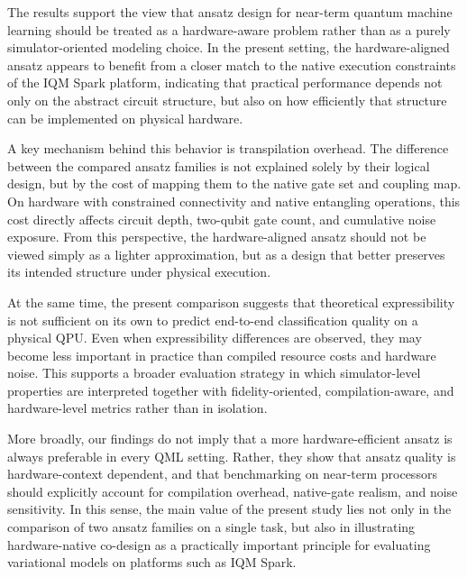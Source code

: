 \documentclass[11pt]{article}
\begin{document}
The results support the view that ansatz design for near-term quantum machine learning should be treated as a hardware-aware problem rather than as a purely simulator-oriented modeling choice. In the present setting, the hardware-aligned ansatz appears to benefit from a closer match to the native execution constraints of the IQM Spark platform, indicating that practical performance depends not only on the abstract circuit structure, but also on how efficiently that structure can be implemented on physical hardware.

A key mechanism behind this behavior is transpilation overhead. The difference between the compared ansatz families is not explained solely by their logical design, but by the cost of mapping them to the native gate set and coupling map. On hardware with constrained connectivity and native entangling operations, this cost directly affects circuit depth, two-qubit gate count, and cumulative noise exposure. From this perspective, the hardware-aligned ansatz should not be viewed simply as a lighter approximation, but as a design that better preserves its intended structure under physical execution.

At the same time, the present comparison suggests that theoretical expressibility is not sufficient on its own to predict end-to-end classification quality on a physical QPU. Even when expressibility differences are observed, they may become less important in practice than compiled resource costs and hardware noise. This supports a broader evaluation strategy in which simulator-level properties are interpreted together with fidelity-oriented, compilation-aware, and hardware-level metrics rather than in isolation.

More broadly, our findings do not imply that a more hardware-efficient ansatz is always preferable in every QML setting. Rather, they show that ansatz quality is hardware-context dependent, and that benchmarking on near-term processors should explicitly account for compilation overhead, native-gate realism, and noise sensitivity. In this sense, the main value of the present study lies not only in the comparison of two ansatz families on a single task, but also in illustrating hardware-native co-design as a practically important principle for evaluating variational models on platforms such as IQM Spark.
\end{document}
